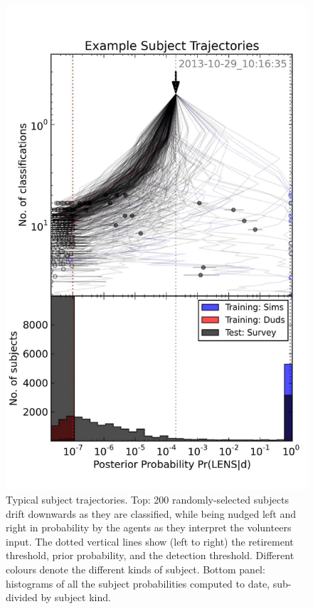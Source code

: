 \documentclass[useAMS,usenatbib,a4paper]{mn2e}
\begin{document}
\begin{figure}
\centering\includegraphics[width=0.9\linewidth]{CFHTLS_2013-10-29_101635_trajectories.pdf}
\caption{Typical \SW \StageOne subject trajectories. Top: 200 randomly-selected
subjects drift downwards as they are classified, while being nudged left and
right in probability by the agents as they interpret the volunteers input. The
dotted vertical lines show (left to right) the retirement threshold, prior
probability, and the detection threshold. Different colours denote the different
kinds of subject. Bottom panel: histograms of all the subject probabilities
computed to date, sub-divided by subject kind.}
\label{fig:swap:subject-trajectories}
\end{figure}
\end{document}
